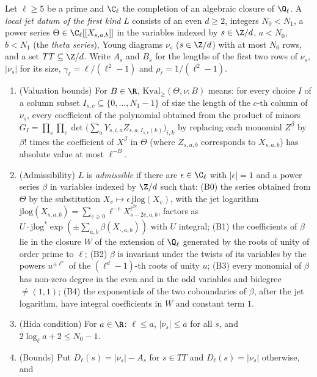 \begin{definition}\label{pf:sh-curv:jetloc}
Let $\ell\ge5$ be a prime and $\C_\ell$ the completion of an algebraic closure of $\Q_\ell$. A \emph{local jet datum of the
first kind} $L$ consists of an even $d\ge2$, integers $N_0<N_1$, a power series $\Theta\in\C_\ell[[X_{s,a,b}]]$ in the
variables indexed by $s\in\Z/d$, $a<N_0$, $b<N_1$ (the \emph{theta series}), Young diagrams $\nu_s$ ($s\in\Z/d$) with at most
$N_0$ rows, and a set $TT\subseteq\Z/d$. Write $A_s$ and $B_s$ for the lengths of the first two rows of $\nu_s$, $|\nu_s|$ for
its size, $\gamma_\ell=\ell/(\ell^2-1)$ and $\rho_\ell=1/(\ell^2-1)$.
\begin{enumerate}[label=(\alph*)]
\item (Valuation bounds) For $B\in\R$, $\mathrm{Kval}_{\ge}(\Theta,\nu;B)$ means: for every choice $I$ of a column subset
$I_{s,c}\subseteq\{0,\dots,N_1-1\}$ of size the length of the $c$-th column of $\nu_s$, every coefficient of the polynomial
obtained from the product of minors $G_I=\prod_s\prod_c\det\bigl(\sum_aY_{s,i,a}Z_{s,a,I_{s,c}(k)}\bigr)_{i,k}$ by replacing
each monomial $Z^\beta$ by $\beta!$ times the coefficient of $X^\beta$ in $\Theta$ (where $Z_{s,a,b}$ corresponds to
$X_{s,a,b}$) has absolute value at most $\ell^{-B}$.
\item (Admissibility) $L$ is \emph{admissible} if there are $\epsilon\in\C_\ell$ with $|\epsilon|=1$ and a power series $\beta$
in variables indexed by $\Z/d$ such that: (B0) the series obtained from $\Theta$ by the substitution
$X_v\mapsto\epsilon\,\mathrm{jlog}(X_v)$, with the jet logarithm $\mathrm{jlog}(X_{s,a,b})=\sum_{e\ge0}\ell^{-e}
X_{s-2e,a,b}^{\ell^{2e}}$, factors as $U\cdot\mathrm{jlog}^*\exp(\pm\sum_{a,b}\beta(X_{\cdot,a,b}))$ with $U$ integral;
(B1) the coefficients of $\beta$ lie in the closure $W$ of the extension of $\Q_\ell$ generated by the roots of unity of
order prime to $\ell$; (B2) $\beta$ is invariant under the twists of its variables by the powers $u^{\pm\ell^s}$ of the
$(\ell^d-1)$-th roots of unity $u$; (B3) every monomial of $\beta$ has non-zero degree in the even and in the odd variables
and bidegree $\ne(1,1)$; (B4) the exponentials of the two coboundaries of $\beta$, after the jet logarithm, have integral
coefficients in $W$ and constant term $1$.
\item (Hida condition) For $a\in\R$: $\ell\le a$, $|\nu_s|\le a$ for all $s$, and $2\log_\ell a+2\le N_0-1$.
\item (Bounds) Put $D_\ell(s)=|\nu_s|-A_s$ for $s\in TT$ and $D_\ell(s)=|\nu_s|$ otherwise, and

\end{enumerate}
\end{definition}
